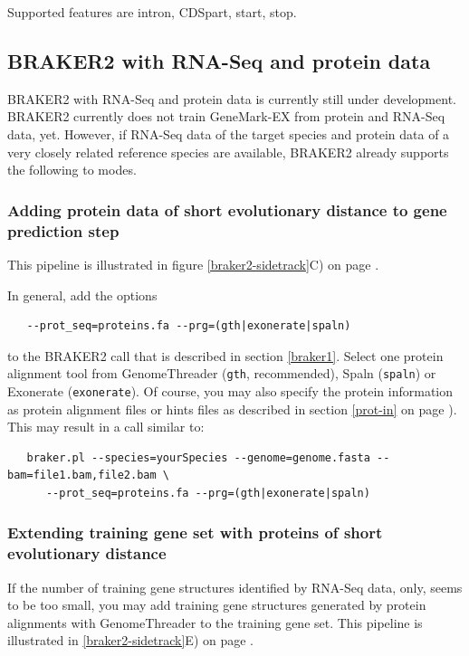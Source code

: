 \documentclass[a4paper,10pt]{report}
\begin{document}
Supported features are intron, CDSpart, start, stop.

\subsection{BRAKER2 with RNA-Seq and protein data}

BRAKER2 with RNA-Seq and protein data is currently still under development. BRAKER2 currently does not train GeneMark-EX from protein and RNA-Seq data, yet. However, if RNA-Seq data of the target species and protein data of a very closely related reference species are available, BRAKER2 already supports the following to modes.

\subsubsection{Adding protein data of short evolutionary distance to gene prediction step}

This pipeline is illustrated in figure \ref{braker2-sidetrack}C) on page \pageref{braker2-sidetrack}.

In general, add the options

\begin{verbatim}
   --prot_seq=proteins.fa --prg=(gth|exonerate|spaln)
\end{verbatim}

to the BRAKER2 call that is described in section \ref{braker1}. Select one protein alignment tool from GenomeThreader (\texttt{gth}, recommended), Spaln (\texttt{spaln}) or Exonerate (\texttt{exonerate}). Of course, you may also specify the protein information as protein alignment files or hints files as described in section \ref{prot-in} on page \pageref{prot-in}). This may result in a call similar to:

\begin{verbatim}
   braker.pl --species=yourSpecies --genome=genome.fasta --bam=file1.bam,file2.bam \
      --prot_seq=proteins.fa --prg=(gth|exonerate|spaln)
\end{verbatim}

\subsubsection{Extending training gene set with proteins of short evolutionary distance}

If the number of training gene structures identified by RNA-Seq data, only, seems to be too small, you may add training gene structures generated by protein alignments with GenomeThreader to the training gene set. This pipeline is illustrated in \ref{braker2-sidetrack}E) on page \pageref{braker2-sidetrack}.
\end{document}
